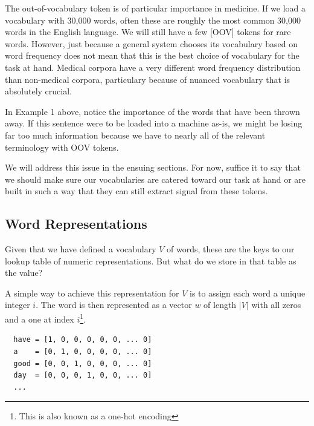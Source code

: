 The out-of-vocabulary token is of particular importance in medicine. If we load a vocabulary with 30,000 words, often these are roughly the most common 30,000 words in the English language. We will still have a few [OOV] tokens
for rare words. However, just because a general system chooses its vocabulary based on word frequency does not mean that this is the best choice of vocabulary for the task at hand. Medical corpora have a very different word frequency
distribution than non-medical corpora, particulary because of nuanced vocabulary that is absolutely crucial.


In Example 1 above, notice the importance of the words that have been thrown away. If this sentence were to be loaded into a machine as-is, we might be losing far too much information because we have to nearly all of the relevant terminology with OOV tokens.

We will address this issue in the ensuing sections. For now, suffice it to say that we should make sure our vocabularies are catered toward our task at hand or are built in such a way that they can still extract signal from these tokens.

\subsection{Word Representations}

Given that we have defined a vocabulary $V$ of words, these are the keys to our lookup table of numeric representations. But what do we store in that table as the value?

A simple way to achieve this representation for $V$ is to assign each word a unique integer $i$.
The word is then represented as a vector $w$ of length $|V|$ with all zeros and a one at index $i$\footnote{This is also known as a one-hot encoding}.

\begin{verbatim}
  have = [1, 0, 0, 0, 0, 0, ... 0]
  a    = [0, 1, 0, 0, 0, 0, ... 0]
  good = [0, 0, 1, 0, 0, 0, ... 0]
  day  = [0, 0, 0, 1, 0, 0, ... 0]
  ...
\end{verbatim}

